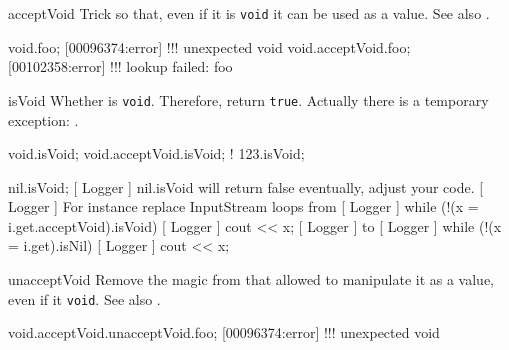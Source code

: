 \begin{urbiscriptapi}
\item[acceptVoid]%
  Trick \this so that, even if it is \lstinline|void| it can be used as a
  value.  See also .
\begin{urbiscript}
void.foo;
[00096374:error] !!! unexpected void
void.acceptVoid.foo;
[00102358:error] !!! lookup failed: foo
\end{urbiscript}


\item[isVoid]%
  Whether \this is \lstinline|void|.  Therefore, return \lstinline|true|.
  Actually there is a temporary exception: .
\begin{urbiassert}
void.isVoid;
void.acceptVoid.isVoid;
! 123.isVoid;

nil.isVoid;
[     Logger     ] nil.isVoid will return false eventually, adjust your code.
[     Logger     ]     For instance replace InputStream loops from
[     Logger     ]       while (!(x = i.get.acceptVoid).isVoid)
[     Logger     ]         cout << x;
[     Logger     ]     to
[     Logger     ]       while (!(x = i.get).isNil)
[     Logger     ]         cout << x;
\end{urbiassert}


\item[unacceptVoid]%
  Remove the magic from \this that allowed to manipulate it as a value, even
  if it \lstinline|void|.  See also .
\begin{urbiscript}
void.acceptVoid.unacceptVoid.foo;
[00096374:error] !!! unexpected void
\end{urbiscript}
\end{urbiscriptapi}




